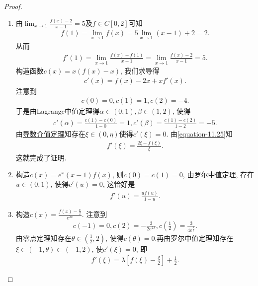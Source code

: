 \documentclass[../../main.tex]{subfiles}%
\begin{document}
\begin{proof}
\begin{enumerate}
\item 由\(\lim_{x\rightarrow 1}\frac{f(x) - 2}{x - 1}=5\)及\(f\in C[0,2]\)可知
\begin{align*}
f(1)=\lim_{x\rightarrow 1}f(x)=5\lim_{x\rightarrow 1}(x - 1)+2=2.
\end{align*}
从而
\begin{align*}
f'(1)=\lim_{x\rightarrow 1}\frac{f(x)-f(1)}{x - 1}=\lim_{x\rightarrow 1}\frac{f(x)-2}{x - 1}=5.
\end{align*}
构造函数\(c(x)=x(f(x)-x)\), 我们求导得
\begin{align}\label{equation-11.25}
c'(x)=f(x)-2x+xf'(x).
\end{align}
注意到
\begin{align*}
c(0)=0,c(1)=1,c(2)=-4.
\end{align*}
于是由Lagrange中值定理得\(\alpha\in(0,1),\beta\in(1,2)\), 使得
\begin{align*}
c'(\alpha)=\frac{c(1)-c(0)}{1 - 0}=1,c'(\beta)=\frac{c(1)-c(2)}{1 - 2}=-5.
\end{align*}
由\hyperref[theorem:导数介值定理]{导数介值定理}知存在\(\xi\in(0,\eta)\)使得\(c'(\xi)=0\). 由\eqref{equation-11.25}知
\begin{align*}
f'(\xi)=\frac{2\xi - f(\xi)}{\xi}.
\end{align*}
这就完成了证明.

\item 构造\(c(x)=e^{x}(x - 1)f(x)\), 则\(c(0)=c(1)=0\), 由罗尔中值定理, 存在\(u\in(0,1)\), 使得\(c'(u)=0\), 这恰好是
\begin{align*}
f'(u)=\frac{uf(u)}{1 - u}.
\end{align*}

\item 构造\(c(x)=\frac{f(x)-\frac{x}{2}}{e^{\lambda x}}\). 注意到
\begin{align*}
c(-1)=0,c(2)=-\frac{3}{2e^{2\lambda}},c\left(\frac{1}{2}\right)=\frac{3}{4e^{\frac{\lambda}{2}}}.
\end{align*}
由零点定理知存在\(\theta\in(\frac{1}{2},2)\), 使得\(c(\theta)=0\).再由罗尔中值定理知存在\(\xi\in(-1,\theta)\subset(-1,2)\), 使\(c'(\xi)=0\), 即
\begin{align*}
f'(\xi)=\lambda\left[f(\xi)-\frac{\xi}{2}\right]+\frac{1}{2}.
\end{align*}
\end{enumerate}

\end{proof}
\end{document}
